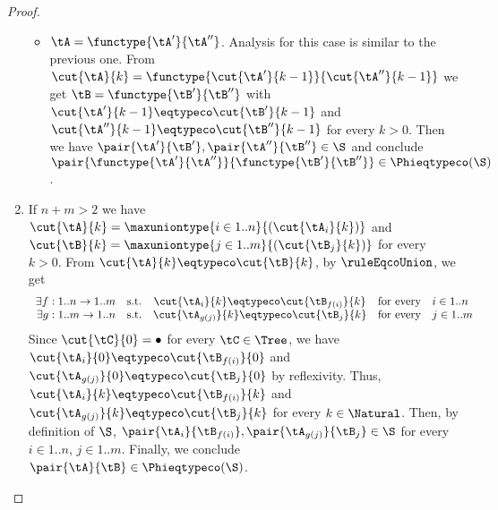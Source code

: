 \begin{proof}
\begin{enumerate}
\begin{itemize}
    \item $\tA = \functype{\tA'}{\tA''}$. Analysis for this case is similar to
    the previous one. From $\cut{\tA}{k} =
    \functype{\cut{\tA'}{k-1}}{\cut{\tA''}{k-1}}$ we get $\tB =
    \functype{\tB'}{\tB''}$ with $\cut{\tA'}{k-1} \eqtypeco \cut{\tB'}{k-1}$
    and $\cut{\tA''}{k-1} \eqtypeco \cut{\tB''}{k-1}$ for every $k > 0$. Then
    we have $\pair{\tA'}{\tB'}, \pair{\tA''}{\tB''} \in \S$ and conclude
    $\pair{\functype{\tA'}{\tA''}}{\functype{\tB'}{\tB''}} \in
    \Phieqtypeco\!\left(\S\right)$.
  \end{itemize}
  
  \item If $n + m > 2$ we have $\cut{\tA}{k} =
  \maxuniontype{i \in 1..n}{(\cut{\tA_i}{k})}$ and $\cut{\tB}{k} =
  \maxuniontype{j \in 1..m}{(\cut{\tB_j}{k})}$ for every $k > 0$. From
  $\cut{\tA}{k} \eqtypeco \cut{\tB}{k}$, by $\ruleEqcoUnion$, we get $$
\begin{array}{r@{\quad\text{s.t.}\quad}c@{\quad\text{for every}\quad}l}
\exists f : 1..n \to 1..m & \cut{\tA_i}{k} \eqtypeco \cut{\tB_{f(i)}}{k} & i \in 1..n \\
\exists g : 1..m \to 1..n & \cut{\tA_{g(j)}}{k} \eqtypeco \cut{\tB_j}{k} & j \in 1..m
\end{array} $$
  Since $\cut{\tC}{0} = \bullet$ for every $\tC \in \Tree$, we have
  $\cut{\tA_i}{0} \eqtypeco \cut{\tB_{f(i)}}{0}$ and $\cut{\tA_{g(j)}}{0}
  \eqtypeco \cut{\tB_j}{0}$ by reflexivity. Thus, $\cut{\tA_i}{k} \eqtypeco
  \cut{\tB_{f(i)}}{k}$ and $\cut{\tA_{g(j)}}{k} \eqtypeco \cut{\tB_j}{k}$ for
  every $k \in \Natural$. Then, by definition of $\S$,
  $\pair{\tA_i}{\tB_{f(i)}}, \pair{\tA_{g(j)}}{\tB_j} \in \S$ for every $i \in
  1..n$, $j \in 1..m$. Finally, we conclude $\pair{\tA}{\tB} \in
  \Phieqtypeco\!\left(\S\right)$.
\end{enumerate}


\end{proof}
